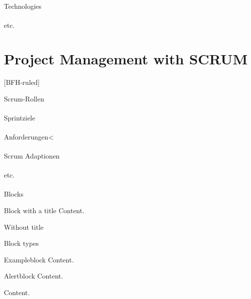 \documentclass[
    ngerman,%
    authorontitle=true,
]{bfhbeamer}
\begin{document}
    \begin{frame}{Technologies}
        \framesubtitle{}
    \end{frame}

    \begin{frame}{etc.}
        \framesubtitle{}
    \end{frame}

    \section{Project Management with SCRUM}
    [BFH-ruled]
    \frame{\sectionpage}

    \begin{frame}{Scrum-Rollen}
        \framesubtitle{}
    \end{frame}

    \begin{frame}{Sprintziele}
        \framesubtitle{}
    \end{frame}

    \begin{frame}{Anforderungen}<
        \framesubtitle{}
    \end{frame}

    \begin{frame}{Scrum Adaptionen}
        \framesubtitle{}
    \end{frame}

    \begin{frame}{etc.}
        \framesubtitle{}
    \end{frame}

    \begin{frame}{Blocks}
        \begin{block}{Block with a title}
            Content.
        \end{block}
        \begin{block}{}
            Without title
        \end{block}
    \end{frame}

    \begin{frame}{Block types}
        \begin{exampleblock}{Exampleblock}
            Content.
        \end{exampleblock}
        \begin{alertblock}{Alertblock}
            Content.
        \end{alertblock}
        \begin{example}
            Content.
        \end{example}
    \end{frame}
\end{document}
